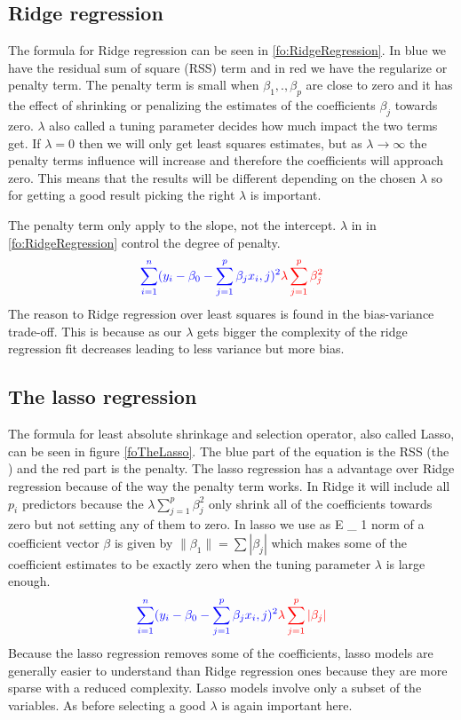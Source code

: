 \subsection{Ridge regression}
The formula for Ridge regression can be seen in \ref{fo:RidgeRegression}. In blue we have the residual sum of square (RSS) term and in red we have the regularize or penalty term. The penalty term is small when $\beta_1, . ,\beta_p$ are close to zero and it has the effect of shrinking or penalizing the estimates of the coefficients $\beta_j$ towards zero. $\lambda$ also called a tuning parameter decides how much impact the two terms get. If $\lambda = 0$ then we will only get least squares estimates, but as $ \lambda \to \infty$ the penalty terms influence will increase and therefore the coefficients will approach zero. This means that the results will be different depending on the chosen $\lambda$ so for getting a good result picking the right $\lambda$ is important.

\noindent The penalty term only apply to the slope, not the intercept. $\lambda$ in in \ref{fo:RidgeRegression} control the degree of penalty.
\begin{align}\label{fo:RidgeRegression}
\color{blue} \sum_{i=1}^{n} ( y_i - \beta_0 - \sum_{j=1}^{p} \beta_j x_i,j )^2  \color{red} \lambda \sum_{j=1}^{p} \beta^2_j 
\end{align}
The reason to Ridge regression over least squares is found in the bias-variance
trade-off. This is because as our $\lambda$ gets bigger the complexity of the ridge regression fit decreases leading to less variance but more bias.

\subsection{The lasso regression}
The formula for least absolute shrinkage and selection operator, also called Lasso, can be seen in figure \ref{foTheLasso}. The blue part of the equation is the RSS (the ) and the red part is the penalty. The lasso regression has a advantage over Ridge regression because of the way the penalty term works. In Ridge it will include all $p_i$ predictors because the $\lambda \sum_{j=1}^{p} \beta^2_j$ only shrink all of the coefficients towards zero but not setting any of them to zero. In lasso we use as E \_ 1 norm of a coefficient vector $\beta$ is given by $ \lVert \beta_1 \rVert = \sum | \beta_j |$ which makes some of the coefficient estimates to be exactly zero when the tuning parameter $\lambda$ is large enough.
\begin{align}\label{fo:TheLasso}
\color{blue} \sum_{i=1}^{n} ( y_i - \beta_0 - \sum_{j=1}^{p} \beta_j x_i,j )^2  \color{red} \lambda \sum_{j=1}^{p} |\beta_j|
\end{align}
Because the lasso regression removes some of the coefficients, lasso models are generally easier to understand than Ridge regression ones because they are  more sparse with a reduced complexity. Lasso models involve only a subset of the variables. As before selecting a good $\lambda$ is again important here.

